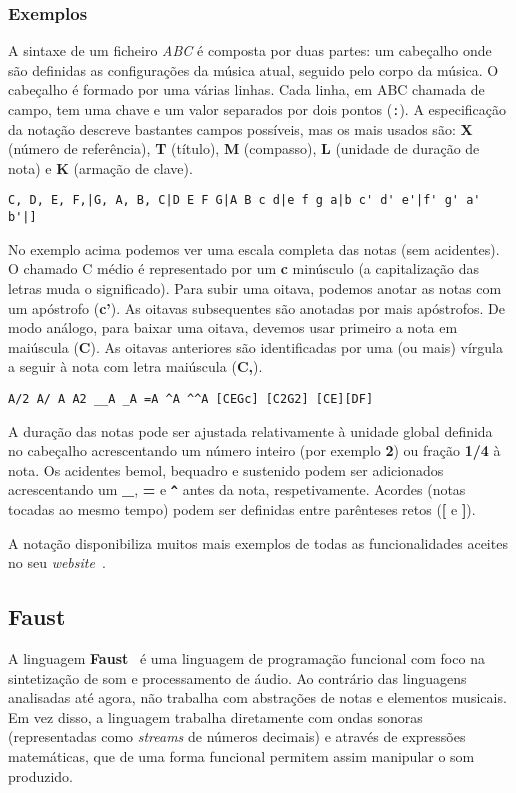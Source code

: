     \subsubsection{Exemplos}
A sintaxe de um ficheiro \textit{ABC} é composta por duas partes: um cabeçalho onde são definidas as configurações da música atual, seguido pelo corpo da música. O cabeçalho é formado por uma várias linhas. Cada linha, em ABC chamada de campo, tem uma chave e um valor separados por dois pontos (\texttt{:}). A especificação da notação descreve bastantes campos possíveis, mas os mais usados são: \textbf{X} (número de referência), \textbf{T} (título), \textbf{M} (compasso), \textbf{L} (unidade de duração de nota) e \textbf{K} (armação de clave).

\begin{lstlisting}[caption={Exemplo da notação ABC}]
C, D, E, F,|G, A, B, C|D E F G|A B c d|e f g a|b c' d' e'|f' g' a' b'|]
\end{lstlisting}

No exemplo acima podemos ver uma escala completa das notas (sem acidentes). O chamado C médio é representado por um \textbf{c} minúsculo (a capitalização das letras muda o significado). Para subir uma oitava, podemos anotar as notas com um apóstrofo (\textbf{c'}). As oitavas subsequentes são anotadas por mais apóstrofos. De modo análogo, para baixar uma oitava, devemos usar primeiro a nota em maiúscula (\textbf{C}). As oitavas anteriores são identificadas por uma (ou mais) vírgula a seguir à nota com letra maiúscula (\textbf{C,}).


\begin{lstlisting}[caption={Exemplo da notação ABC}]
A/2 A/ A A2 __A _A =A ^A ^^A [CEGc] [C2G2] [CE][DF]
\end{lstlisting}
A duração das notas pode ser ajustada relativamente à unidade global definida no cabeçalho acrescentando um número inteiro (por exemplo \textbf{2}) ou fração \textbf{1/4} à nota. Os acidentes bemol, bequadro e sustenido podem ser adicionados acrescentando um \textbf{\_}, \textbf{=} e \textbf{\texttt{\textasciicircum{}}} antes da nota, respetivamente. Acordes (notas tocadas ao mesmo tempo) podem ser definidas entre parênteses retos (\textbf{[} e \textbf{]}).

A notação disponibiliza muitos mais exemplos de todas as funcionalidades aceites no seu \textit{website}~\citep{abc-notation-examples}.

\subsection{Faust}
A linguagem \textbf{Faust}~\citep{orlarey:Faust, orlarey:hal-02158894} é uma linguagem de programação funcional com foco na sintetização de som e processamento de áudio. Ao contrário das linguagens analisadas até agora, não trabalha com abstrações de notas e elementos musicais. Em vez disso, a linguagem trabalha diretamente com ondas sonoras (representadas como \textit{streams} de números decimais) e através de expressões matemáticas, que de uma forma funcional permitem assim manipular o som produzido.

